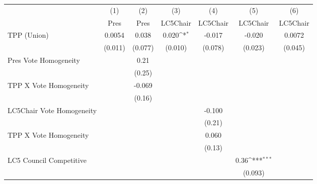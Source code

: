 {
\def\sym#1{\ifmmode^{#1}\else\(^{#1}\)\fi}
\begin{tabular}{l*{6}{c}}
\toprule
                &\multicolumn{1}{c}{(1)}&\multicolumn{1}{c}{(2)}&\multicolumn{1}{c}{(3)}&\multicolumn{1}{c}{(4)}&\multicolumn{1}{c}{(5)}&\multicolumn{1}{c}{(6)}\\
                &\multicolumn{1}{c}{Pres}&\multicolumn{1}{c}{Pres}&\multicolumn{1}{c}{LC5Chair}&\multicolumn{1}{c}{LC5Chair}&\multicolumn{1}{c}{LC5Chair}&\multicolumn{1}{c}{LC5Chair}\\
\midrule
TPP (Union)     &   0.0054         &    0.038         &    0.020\sym{*}  &   -0.017         &   -0.020         &   0.0072         \\
                &  (0.011)         &  (0.077)         &  (0.010)         &  (0.078)         &  (0.023)         &  (0.045)         \\
Pres Vote Homogeneity&                  &     0.21         &                  &                  &                  &                  \\
                &                  &   (0.25)         &                  &                  &                  &                  \\
TPP X Vote Homogeneity&                  &   -0.069         &                  &                  &                  &                  \\
                &                  &   (0.16)         &                  &                  &                  &                  \\
LC5Chair Vote Homogeneity&                  &                  &                  &   -0.100         &                  &                  \\
                &                  &                  &                  &   (0.21)         &                  &                  \\
TPP X Vote Homogeneity&                  &                  &                  &    0.060         &                  &                  \\
                &                  &                  &                  &   (0.13)         &                  &                  \\
LC5 Council Competitive&                  &                  &                  &                  &     0.36\sym{***}&                  \\
                &                  &                  &                  &                  &  (0.093)         &                  \\

\end{tabular}}

